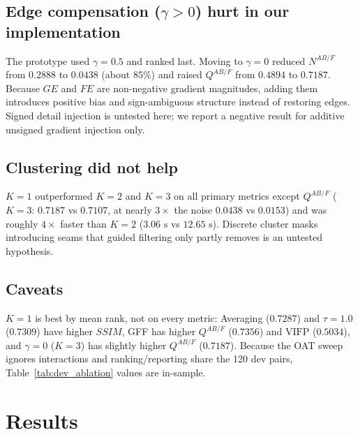 \documentclass[conference]{IEEEtran}
\begin{document}
\subsection{Edge compensation ($\gamma > 0$) hurt in our implementation}
The prototype used $\gamma = 0.5$ and ranked last. Moving to $\gamma = 0$ reduced $N^{AB/F}$ from $0.2888$ to $0.0438$ (about $85\%$) and raised $Q^{AB/F}$ from $0.4894$ to $0.7187$. Because $GE$ and $FE$ are non-negative gradient magnitudes, adding them introduces positive bias and sign-ambiguous structure instead of restoring edges. Signed detail injection is untested here; we report a negative result for additive unsigned gradient injection only.

\subsection{Clustering did not help}
$K = 1$ outperformed $K = 2$ and $K = 3$ on all primary metrics except $Q^{AB/F}$ ($K=3$: $0.7187$ vs $0.7107$, at nearly $3\times$ the noise $0.0438$ vs $0.0153$) and was roughly $4\times$ faster than $K=2$ ($3.06\text{ s}$ vs $12.65\text{ s}$). Discrete cluster masks introducing seams that guided filtering only partly removes is an untested hypothesis.

\subsection{Caveats}
$K = 1$ is best by mean rank, not on every metric: Averaging ($0.7287$) and $\tau=1.0$ ($0.7309$) have higher $SSIM$, GFF has higher $Q^{AB/F}$ ($0.7356$) and $\mathrm{VIFP}$ ($0.5034$), and $\gamma=0$ ($K=3$) has slightly higher $Q^{AB/F}$ ($0.7187$). Because the OAT sweep ignores interactions and ranking/reporting share the 120 dev pairs, Table~\ref{tab:dev_ablation} values are in-sample.

\section{Results}
\end{document}
